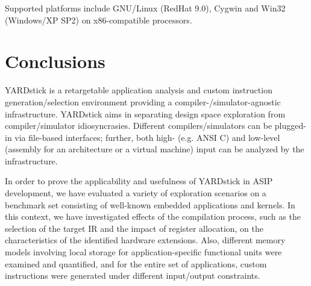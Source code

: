 \documentclass{comjnl}
\begin{document}
Supported platforms include GNU/Linux (RedHat 9.0), Cygwin and Win32 (Windows/XP SP2) on x86-compatible processors.

\section{Conclusions}
\label{Sec:Conclusions}
YARDstick is a retargetable application analysis and custom instruction generation/selection environment providing a compiler-/simulator-agnostic infrastructure. YARDstick aims in separating design space exploration from compiler/simulator idiosyncrasies. Different compilers/simulators can be plugged-in via file-based interfaces; further, both high- (e.g. ANSI C) and low-level (assembly for an architecture or a virtual machine) input can be analyzed by the infrastructure.

In order to prove the applicability and usefulness of YARDstick in ASIP development, we have evaluated a variety of exploration scenarios on a benchmark set consisting of well-known embedded applications and kernels. In this context, we have investigated effects of the compilation process, such as the selection of the target IR and the impact of register allocation, on the characteristics of the identified hardware extensions. Also, different memory models involving local storage for application-specific functional units were examined and quantified, and for the entire set of applications, custom instructions were generated under different input/output constraints.






\nocite{*}



\end{document}
